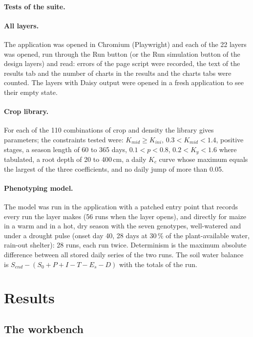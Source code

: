 \paragraph{Tests of the suite.}
\paragraph{All layers.} The application was opened in Chromium (Playwright) and each of the 22 layers was opened, run through the Run button (or the Run simulation button of the design layers) and read: errors of the page script were recorded, the text of the results tab and the number of charts in the results and the charts tabs were counted. The layers with Daisy output were opened in a fresh application to see their empty state.

\paragraph{Crop library.} For each of the 110 combinations of crop and density the library gives parameters; the constraints tested were: $K_{mid}\ge K_{ini}$, $0.3<K_{mid}<1.4$, positive stages, a season length of 60 to 365 days, $0.1<p<0.8$, $0.2<K_y<1.6$ where tabulated, a root depth of 20 to 400\,cm, a daily $K_c$ curve whose maximum equals the largest of the three coefficients, and no daily jump of more than 0.05.

\paragraph{Phenotyping model.} The model was run in the application with a patched entry point that records every run the layer makes (56 runs when the layer opens), and directly for maize in a warm and in a hot, dry season with the seven genotypes, well-watered and under a drought pulse (onset day 40, 28 days at 30\,\% of the plant-available water, rain-out shelter): 28 runs, each run twice. Determinism is the maximum absolute difference between all stored daily series of the two runs. The soil water balance is $S_{end}-(S_0+P+I-T-E_s-D)$ with the totals of the run.


\section{Results}

\subsection{The workbench}
